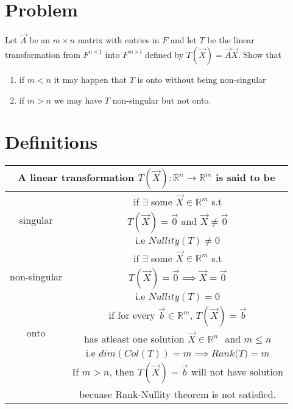 \documentclass[journal,12pt,twocolumn]{IEEEtran}
\newcommand\myemptypage{
    \null
    \thispagestyle{empty}
    \addtocounter{page}{-1}
    \newpage
    }
\begin{document}
\section{Problem}
Let $\vec{A}$ be an $m \times n$ matrix with entries in $F$ and let $T$ be the linear transformation from $F^{n \times1 }$ into $F^{m \times l}$ defined by $T(\vec{X}) = \vec{A}\vec{X}$. Show that 
\begin{enumerate}
\item
if $m < n$ it may happen that $T$ is onto without being non-singular
\item
if $m>n$ we may have $T$ non-singular but not onto.
\\
\end{enumerate}

\section{Definitions}
\begin{table}[hp]
	\begin{center}
		\begin{tabular}{|c|c|}
			\hline
			\multicolumn{2}{|c|}{A linear transformation $T(\vec{X}) : \mathbb{R}^{n} \rightarrow \mathbb{R}^{m}$ is said to be}\\
			\hline
			\multirow{3}{*}{singular} & if $\exists$ some $\vec{X} \in \mathbb{R}^m$ s.t\\
			& \vbox{\begin{equation} \nonumber T(\vec{X}) = \vec{0} \text{ and } \vec{X} \neq \vec{0}\end{equation}}\\
			& \vbox{\begin{equation} \nonumber \text{i.e } Nullity(T) \neq 0 \end{equation}}\\
			\hline
			\multirow{3}{*}{non-singular} & if $\exists$ some $\vec{X} \in \mathbb{R}^m$ s.t\\
			& \vbox{\begin{equation} \nonumber T(\vec{X}) = \vec{0} \implies \vec{X} = \vec{0}\end{equation}}\\
			& \vbox{\begin{equation} \nonumber \text{i.e } Nullity(T) = 0 \end{equation}}\\
			\hline			
			\multirow{3}{*}{onto} & if for every  $\vec{b} \in \mathbb{R}^{m}$, $T(\vec{X})=\vec{b}$\\
			& has atleast one solution $\vec{X} \in \mathbb{R}^{n}$ $\text{ and } m\leq n$\\
			& \vbox{\begin{equation} \nonumber \text{i.e } dim(Col(T)) = m \implies\textit{Rank(T)} = m \end{equation}}\\
			& If $m>n$, then $T(\vec{X})=\vec{b}$ will not have solution \\
			& becuase Rank-Nullity theorem is not satisfied.\\
			\hline
		\end{tabular}
	\end{center}
\end{table}
\pagebreak
\myemptypage
\end{document}
